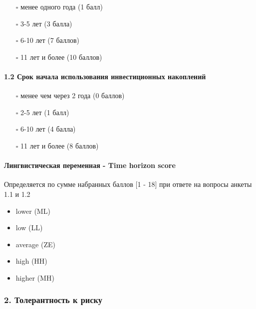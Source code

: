 \documentclass[11pt]{article}
\providecommand{\tightlist}{%
      \setlength{\itemsep}{0pt}\setlength{\parskip}{0pt}}
\begin{document}
\begin{itemize}
\tightlist
\item[$\square$]
  менее одного года (1 балл)
\item[$\square$]
  3-5 лет (3 балла)
\item[$\square$]
  6-10 лет (7 баллов)
\item[$\square$]
  11 лет и более (10 баллов)
\end{itemize}

\paragraph{1.2 Срок начала использования инвестиционных
накоплений}\label{ux441ux440ux43eux43a-ux43dux430ux447ux430ux43bux430-ux438ux441ux43fux43eux43bux44cux437ux43eux432ux430ux43dux438ux44f-ux438ux43dux432ux435ux441ux442ux438ux446ux438ux43eux43dux43dux44bux445-ux43dux430ux43aux43eux43fux43bux435ux43dux438ux439}

\begin{itemize}
\tightlist
\item[$\square$]
  менее чем через 2 года (0 баллов)
\item[$\square$]
  2-5 лет (1 балл)
\item[$\square$]
  6-10 лет (4 балла)
\item[$\square$]
  11 лет и более (8 баллов)
\end{itemize}

\paragraph{Лингвистическая переменная - Time horizon
score}\label{ux43bux438ux43dux433ux432ux438ux441ux442ux438ux447ux435ux441ux43aux430ux44f-ux43fux435ux440ux435ux43cux435ux43dux43dux430ux44f---time-horizon-score}

Определяется по сумме набранных баллов {[}1 - 18{]} при ответе на
вопросы анкеты 1.1 и 1.2

\begin{itemize}
\tightlist
\item
  lower (ML)
\item
  low (LL)
\item
  average (ZE)
\item
  high (HH)
\item
  higher (MH)
\end{itemize}

\subsubsection{2. Толерантность к
риску}\label{ux442ux43eux43bux435ux440ux430ux43dux442ux43dux43eux441ux442ux44c-ux43a-ux440ux438ux441ux43aux443}
\end{document}
